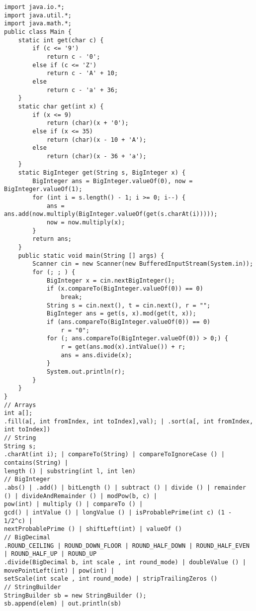 \lstset{
	language=JAVA,
	tabsize=2,
	numbers=left,
	extendedchars=false,
	showstringspaces=false,
	xleftmargin=0em,
	xrightmargin=0em,
	frame=trbl,
	numberstyle=\scriptsize\Courier,
    basicstyle=\scriptsize\Courier
}
\begin{lstlisting}
import java.io.*;
import java.util.*;
import java.math.*;
public class Main {
	static int get(char c) {
		if (c <= '9')
			return c - '0';
		else if (c <= 'Z')
			return c - 'A' + 10;
		else
			return c - 'a' + 36;
	}
	static char get(int x) {
		if (x <= 9)
			return (char)(x + '0');
		else if (x <= 35)
			return (char)(x - 10 + 'A');
		else
			return (char)(x - 36 + 'a');
	}
	static BigInteger get(String s, BigInteger x) {
		BigInteger ans = BigInteger.valueOf(0), now = BigInteger.valueOf(1);
		for (int i = s.length() - 1; i >= 0; i--) {
			ans = ans.add(now.multiply(BigInteger.valueOf(get(s.charAt(i)))));
			now = now.multiply(x);
		}
		return ans;
	}
	public static void main(String [] args) {
		Scanner cin = new Scanner(new BufferedInputStream(System.in));
		for (; ; ) {
			BigInteger x = cin.nextBigInteger();
			if (x.compareTo(BigInteger.valueOf(0)) == 0)
				break;
			String s = cin.next(), t = cin.next(), r = "";
			BigInteger ans = get(s, x).mod(get(t, x));
			if (ans.compareTo(BigInteger.valueOf(0)) == 0)
				r = "0";
			for (; ans.compareTo(BigInteger.valueOf(0)) > 0;) {
				r = get(ans.mod(x).intValue()) + r;
				ans = ans.divide(x);
			}
			System.out.println(r);
		}
	}
}
// Arrays
int a[];
.fill(a[, int fromIndex, int toIndex],val); | .sort(a[, int fromIndex, int toIndex])
// String
String s;
.charAt(int i); | compareTo(String) | compareToIgnoreCase () | contains(String) |
length () | substring(int l, int len)
// BigInteger
.abs() | .add() | bitLength () | subtract () | divide () | remainder () | divideAndRemainder () | modPow(b, c) |
pow(int) | multiply () | compareTo () |
gcd() | intValue () | longValue () | isProbablePrime(int c) (1 - 1/2^c) |
nextProbablePrime () | shiftLeft(int) | valueOf ()
// BigDecimal
.ROUND_CEILING | ROUND_DOWN_FLOOR | ROUND_HALF_DOWN | ROUND_HALF_EVEN | ROUND_HALF_UP | ROUND_UP
.divide(BigDecimal b, int scale , int round_mode) | doubleValue () | movePointLeft(int) | pow(int) |
setScale(int scale , int round_mode) | stripTrailingZeros ()
// StringBuilder
StringBuilder sb = new StringBuilder ();
sb.append(elem) | out.println(sb)
\end{lstlisting}
